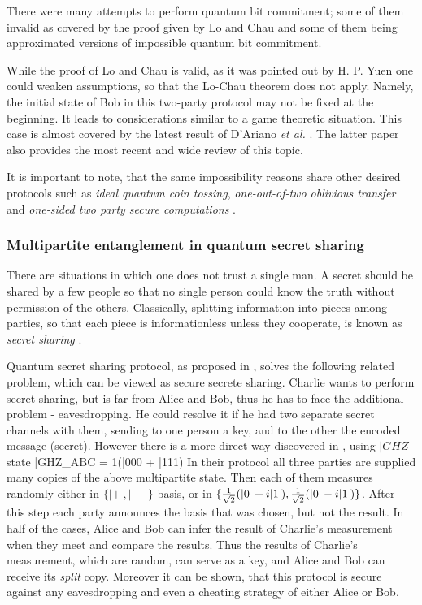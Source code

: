 \documentclass[rmp,12pt,preprint]{revtex4-2}
\begin{document}
There were many attempts to perform quantum bit commitment; some of
them invalid as covered by the proof given by Lo and Chau and some
of them being approximated versions of impossible quantum bit
commitment.

While the proof of Lo and Chau is valid, as it was  pointed out by
H. P. Yuen \cite{Yuen_bc} one could weaken assumptions, so that the
Lo-Chau theorem does not apply.  Namely, the initial state of Bob in
this two-party protocol may not be fixed at the beginning. It leads
to considerations similar to a game theoretic situation.
This case is almost covered by the latest result of D'Ariano {\it et
al.} \cite{DAriano_bc}. The latter paper also provides the most recent and
wide review of this topic.

It is important to note, that the same impossibility reasons share other desired protocols such as {\it ideal quantum coin tossing}, {\it one-out-of-two oblivious transfer} and {\it one-sided two party secure computations}
\cite{LoChau_nobitcom2,Lo_noseccomp}.

\subsubsection{Multipartite entanglement in quantum secret sharing}
There are situations in which one does not trust a single man. A
secret should be shared by a few people so that no single person
could know the truth without permission of the others. Classically,
splitting information into pieces among parties, so that each piece
is informationless unless they cooperate, is known as {\it secret
sharing} \cite{Blakley,Shamir}.

Quantum secret sharing protocol, as proposed in \cite{Hillery_secret_sharing}, solves the following related problem, which can be viewed as secure secrete sharing. Charlie wants to perform secret sharing, but is far from Alice and Bob, thus he has to face the additional problem - eavesdropping. He could resolve it if he had two separate secret channels with them,  sending to one person a key, and to the other the encoded message (secret). However there is a more direct way  discovered in \cite{Hillery_secret_sharing}, using $|GHZ\>$ state \be |GHZ\>_{ABC} ={ 1}(|000\> + |111\>) \ee In their protocol all three parties are supplied many copies of the above multipartite state. Then each of them measures randomly either in $\{|+\>,|-\>\}$ basis, or in $\{{
1\over{\sqrt{2}}}(|0\>+i|1\>),{ 1\over{\sqrt{2}}}(|0\>-i|1\>)\}$.
After this step each party announces the basis that was
chosen, but not the result. In half of the cases, Alice and Bob can
infer the result of Charlie's measurement when they meet
and compare the results. Thus the results of Charlie's
measurement, which are random, can serve as a key, and Alice and
Bob can receive its {\it split} copy. Moreover it can be shown, that
this protocol is secure against any eavesdropping and even a
cheating strategy of either Alice or Bob.
\end{document}
